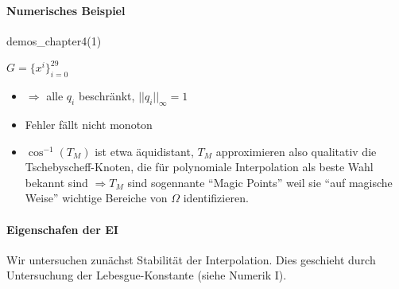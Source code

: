 \paragraph*{Numerisches Beispiel} demos\_chapter4(1)

$G= \{x^i\}_{i=0}^{29}$

\begin{itemize}
 \item $\Rightarrow$ alle $q_i$ beschränkt, $||q_i||_{\infty} = 1$
 \item Fehler fällt nicht monoton
 \item $\cos^{-1}(T_M)$ ist etwa äquidistant, $T_M$ approximieren also qualitativ die Tschebyscheff-Knoten, die für polynomiale Interpolation als beste Wahl bekannt sind $\Rightarrow T_M$ sind sogennante ``Magic Points'' weil sie ``auf magische Weise'' wichtige Bereiche von $\Omega$ identifizieren.
\end{itemize}

\paragraph*{Eigenschafen der EI}

Wir untersuchen zunächst Stabilität der Interpolation. Dies geschieht durch Untersuchung der Lebesgue-Konstante (siehe Numerik I).

